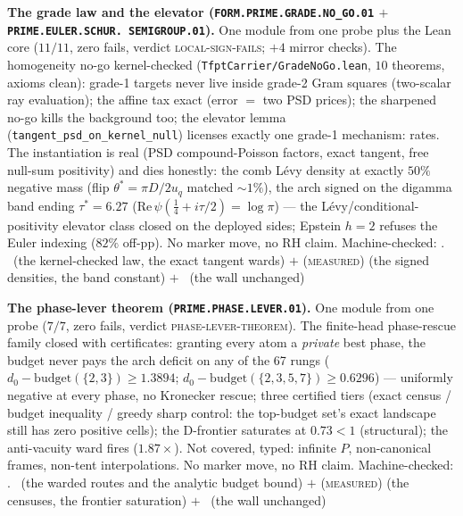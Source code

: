 \par\smallskip\noindent\textbf{The grade law and the elevator
(\texttt{FORM.PRIME.\allowbreak GRADE.\allowbreak NO\_GO.01}
$+$ \texttt{PRIME.EULER.\allowbreak SCHUR.\allowbreak
SEMIGROUP.01}).}
One module from one probe plus the Lean core ($11/11$, zero
fails, verdict \textsc{local-sign-fails}; $+4$ mirror checks).
The homogeneity no-go kernel-checked
(\texttt{TfptCarrier/GradeNoGo.lean}, $10$ theorems, axioms
clean): grade-1 targets never live inside grade-2 Gram squares
(two-scalar ray evaluation); the affine tax exact
(error $=$ two PSD prices); the sharpened no-go kills the
background too; the elevator lemma
(\texttt{tangent\_psd\_on\_kernel\_null}) licenses exactly one
grade-1 mechanism: rates.  The instantiation is real (PSD
compound-Poisson factors, exact tangent, free null-sum
positivity) and dies honestly: the comb L\'evy density at
exactly $50\%$ negative mass (flip $\theta^* = \pi D/2u_q$
matched ${\sim}1\%$), the arch signed on the digamma band
ending $\tau^* = 6.27$ ($\mathrm{Re}\,\psi(\tfrac14 + i\tau/2)
= \log\pi$) --- the L\'evy/conditional-positivity elevator
class closed on the deployed sides; Epstein $h{=}2$ refuses the
Euler indexing ($82\%$ off-pp).  No marker move, no RH claim.
Machine-checked: .
\mE\ (the kernel-checked law, the exact tangent wards) $+$
(\textsc{measured}) (the signed densities, the band constant)
$+$ \mO\ (the wall unchanged)
\par\smallskip


\par\smallskip\noindent\textbf{The phase-lever theorem
(\texttt{PRIME.PHASE.\allowbreak LEVER.01}).}
One module from one probe ($7/7$, zero fails, verdict
\textsc{phase-lever-theorem}).  The finite-head phase-rescue
family closed with certificates: granting every atom a
\emph{private} best phase, the budget never pays the arch
deficit on any of the 67 rungs ($d_0 - \mathrm{budget}(\{2,3\})
\ge 1.3894$; $d_0 - \mathrm{budget}(\{2,3,5,7\}) \ge 0.6296$)
--- uniformly negative at every phase, no Kronecker rescue;
three certified tiers (exact census / budget inequality /
greedy sharp control: the top-budget set's exact landscape
still has zero positive cells); the D-frontier saturates at
$0.73 < 1$ (structural); the anti-vacuity ward fires
($1.87\times$).  Not covered, typed: infinite $P$,
non-canonical frames, non-tent interpolations.  No marker move,
no RH claim.
Machine-checked: .
\mE\ (the warded routes and the analytic budget bound) $+$
(\textsc{measured}) (the censuses, the frontier saturation)
$+$ \mO\ (the wall unchanged)
\par\smallskip


